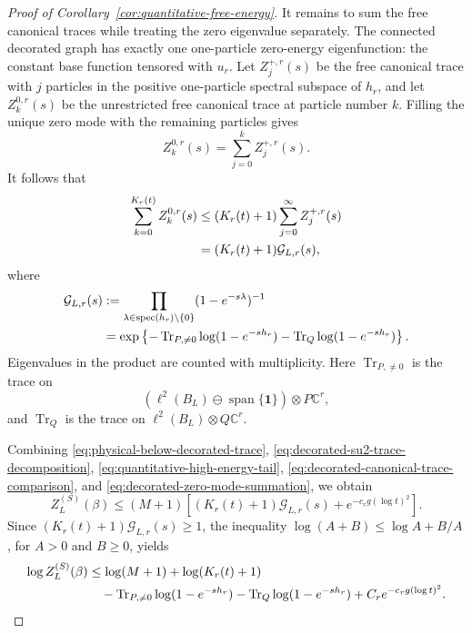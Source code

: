 \documentclass[11pt]{article}
\numberwithin{equation}{section}
\theoremstyle{remark}
\newcommand{\Tr}{\operatorname{Tr}}
\newcommand{\1}{\mathbf 1}
\newcommand{\spec}{\operatorname{spec}}
\begin{document}
\begin{proof}[Proof of Corollary~\ref{cor:quantitative-free-energy}]
It remains to sum the free canonical traces while treating the zero
eigenvalue separately.  The connected decorated graph has exactly one
one-particle zero-energy eigenfunction: the constant base function
tensored with \(u_r\).  Let
\(Z_j^{+,r}(s)\) be the free canonical trace with \(j\) particles in the
positive one-particle spectral subspace of \(h_r\), and let
\(Z_k^{0,r}(s)\) be the unrestricted free canonical trace at particle
number \(k\).  Filling the unique zero mode with the remaining particles
gives
\[
 Z_k^{0,r}(s)=\sum_{j=0}^kZ_j^{+,r}(s).
\]
It follows that
\begin{align}
 \sum_{k=0}^{K_r(t)}Z_k^{0,r}(s)
 &\leq(K_r(t)+1)\sum_{j=0}^{\infty}Z_j^{+,r}(s)\notag\\
 &=(K_r(t)+1)\mathcal G_{L,r}(s),
 \label{eq:decorated-zero-mode-summation}
\end{align}
where
\begin{align}
 \mathcal G_{L,r}(s)
 &:=\prod_{\lambda\in\spec(h_r)\setminus\{0\}}
 (1-e^{-s\lambda})^{-1}\notag\\
 &=\exp\left\{-\Tr_{P,\ne0}\log(1-e^{-sh_r})
 -\Tr_Q\log(1-e^{-sh_r})\right\}.
 \label{eq:decorated-positive-grand-canonical}
\end{align}
Eigenvalues in the product are counted with multiplicity.  Here
\(\Tr_{P,\ne0}\) is the trace on
\[
 (\ell^2(B_L)\ominus\operatorname{span}\{\1\})\otimes P\mathbb C^r,
\]
and \(\Tr_Q\) is the trace on
\(\ell^2(B_L)\otimes Q\mathbb C^r\).

Combining \eqref{eq:physical-below-decorated-trace},
\eqref{eq:decorated-su2-trace-decomposition},
\eqref{eq:quantitative-high-energy-tail},
\eqref{eq:decorated-canonical-trace-comparison}, and
\eqref{eq:decorated-zero-mode-summation}, we obtain
\[
 Z_L^{(S)}(\beta)
 \leq(M+1)\left[(K_r(t)+1)\mathcal G_{L,r}(s)
 +e^{-c_rg(\log t)^2}\right].
\]
Since \((K_r(t)+1)\mathcal G_{L,r}(s)\geq1\), the inequality
\(\log(A+B)\leq\log A+B/A\), for \(A>0\) and \(B\geq0\), yields
\begin{align}
 \log Z_L^{(S)}(\beta)
 &\leq\log(M+1)+\log(K_r(t)+1)\notag\\
 &\quad-\Tr_{P,\ne0}\log(1-e^{-sh_r})
 -\Tr_Q\log(1-e^{-sh_r})
 +C_re^{-c_rg(\log t)^2}.
 \label{eq:decorated-free-pressure}
\end{align}


\end{proof}
\end{document}
